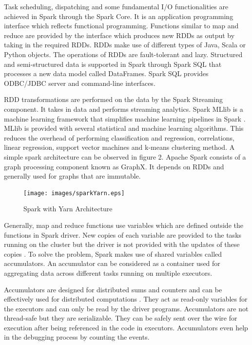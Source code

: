 \documentclass[9pt,twocolumn,twoside]{../../styles/osajnl}
\begin{document}
Task scheduling, dispatching and some fundamental I/O functionalities
are achieved in Spark through the Spark Core. It is an application
programming interface which reflects functional programming. Functions
similar to map and reduce are provided by the interface which produces
new RDDs as output by taking in the required RDDs. RDDs make use of
different types of Java, Scala or Python objects. The operations of
RDDs are fault-tolerant and lazy. Structured and semi-structured data
is supported in Spark through Spark SQL that processes a new data
model called DataFrames. Spark SQL provides ODBC/JDBC server and
command-line interfaces.

RDD transformations are performed on the data by the Spark Streaming
component. It takes in data and performs streaming analytics. Spark
MLlib is a machine learning framework that simplifies machine learning
pipelines in Spark \cite{sparkWiki}. MLlib is provided with several
statistical and machine learning algorithms. This reduces the overhead
of performing classification and regression, correlations, linear
regression, support vector machines and k-means clustering method. A
simple spark architecture can be observed in figure 2. Apache Spark
consists of a graph processing component known as GraphX. It depends
on RDDs and generally used for graphs that are immutable.

\begin{figure}[ht]
  \texttt{[image: images/sparkYarn.eps]}
  \caption{Spark with Yarn Architecture} \cite{sparkwithYarn}
\end{figure}

Generally, map and reduce functions use variables which are defined
outside the functions in Spark driver. New copies of each variable are
provided to the tasks running on the cluster but the driver is not
provided with the updates of these copies \cite{accumulatorSpark}. To
solve the problem, Spark makes use of shared variables called
accumulators. An accumulator can be considered as a container used for
aggregating data across different tasks running on multiple executors.

Accumulators are designed for distributed sums and counters and can be
effectively used for distributed computations
\cite{accumulatorGit}. They act as read-only variables for the
executors and can only be read by the driver programs. Accumulators
are not thread-safe but they are serializable. They can be safely sent
over the wire for execution after being referenced in the code in
executors. Accumulators even help in the debugging process by counting
the events.
\end{document}
